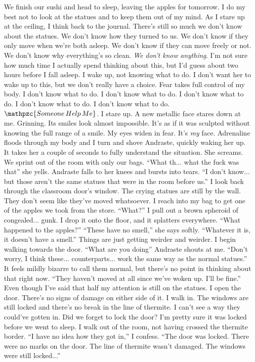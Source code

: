 \documentclass[a4paper, 12pt]{book}
\newcommand\tab[1][1cm]{\hspace*{#1}}
\begin{document}
\newline
\tab
We finish our sushi and head to sleep, leaving the apples for tomorrow. I do my best not to look at the statues and to keep them out of my mind. As I stare up at the ceiling, I think back to the journal. There’s still so much we don’t know about the statues. We don’t know how they turned to us. We don’t know if they only move when we’re both asleep. We don’t know if they can move freely or not. We don’t know why everything’s so clean.  \textit{We don’t know anything}. I’m not sure how much time I actually spend thinking about this, but I’d guess about two hours before I fall asleep. 
\newline
\tab
I wake up, not knowing what to do. I don’t want her to wake up to this, but we don’t really have a choice. Fear takes full control of my body. I don’t know what to do. I don’t know what to do. I don’t know what to do. I don’t know what to do. I don’t know what to do. $\mathpzc{Someone\, Help\, Me}$. I stare up. A new metallic face stares down at me. Grinning. Its smiles look almost impossible. It’s as if it was sculpted without knowing the full range of a smile. My eyes widen in fear. It's \textit{my} face. 
\newline
\tab
Adrenaline floods through my body and I turn and shove Andraste, quickly waking her up. It takes her a couple of seconds to fully understand the situation. She screams. We sprint out of the room with only our bags. ``What th... what the fuck was that\textinterrobang'' she yells. Andraste falls to her knees and bursts into tears.
\newline
\tab
``I don’t know... but those aren’t the same statues that were in the room before us.'' I look back through the classroom door’s window. The crying statues are still by the wall. They don’t seem like they’ve moved whatsoever. I reach into my bag to get one of the apples we took from the store. ``What?'' I pull out a brown spheroid of congealed... gunk. I drop it onto the floor, and it splatters everywhere. ``What happened to the apples?''
\newline
\tab
``These have no smell,'' she says softly. ``Whatever it is, it doesn’t have a smell.'' Things are just getting weirder and weirder. I begin walking towards the door. ``What are you doing\textinterrobang'' Andraste shouts at me.
\newline
\tab
``Don’t worry, I think these... counterparts... work the same way as the normal statues.'' It feels mildly bizarre to call them normal, but there’s no point in thinking about that right now. ``They haven’t moved at all since we’ve woken up. I’ll be fine.'' Even though I’ve said that half my attention is still on the statues. I open the door. There’s no signs of damage on either side of it. I walk in. The windows are still locked and there’s no break in the line of thermite. I can’t see a way they could’ve gotten in. Did we forget to lock the door? I’m pretty sure it was locked before we went to sleep. I walk out of the room, not having crossed the thermite border. ``I have no idea how they got in,'' I confess. ``The door was locked. There were no marks on the door. The line of thermite wasn’t damaged. The windows were still locked...''
\end{document}
